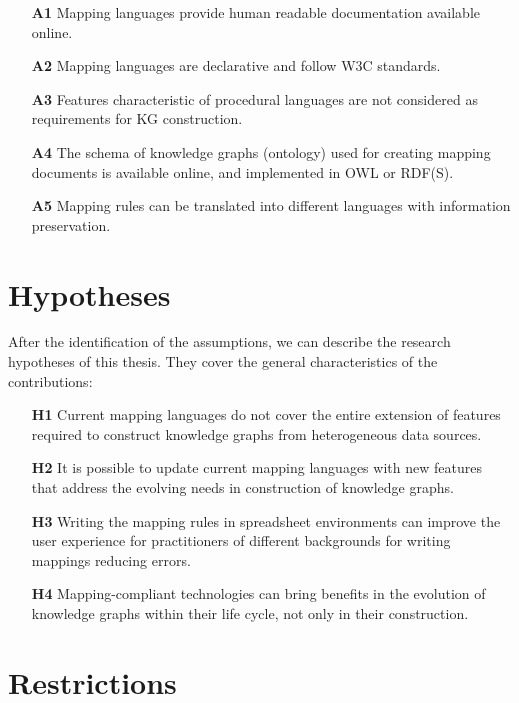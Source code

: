 \begin{enumerate}
    \item[\textbf{A1}] Mapping languages provide human readable documentation available online.
    \item[\textbf{A2}] Mapping languages are declarative and follow W3C standards.
    \item[\textbf{A3}] Features characteristic of procedural languages are not considered as requirements for KG construction. 
    \item[\textbf{A4}] The schema of knowledge graphs (ontology) used for creating mapping documents is available online, and implemented in OWL or RDF(S). 
    \item[\textbf{A5}] Mapping rules can be translated into different languages with information preservation.
\end{enumerate}


\section{Hypotheses}
\label{sec:chp3-hypotheses}

After the identification of the assumptions, we can describe the research hypotheses  of this thesis. They cover the general characteristics of the contributions:

\begin{enumerate}
    \item[\textbf{H1}] Current mapping languages do not cover the entire extension of features required to construct knowledge graphs from heterogeneous data sources.
    \item[\textbf{H2}] It is possible to update  current mapping languages with new features that address the evolving needs in construction of knowledge graphs.
    \item[\textbf{H3}] Writing the mapping rules in spreadsheet environments can improve the user experience for practitioners of different backgrounds for writing mappings reducing errors. 
    \item[\textbf{H4}] Mapping-compliant technologies can bring benefits in the evolution of knowledge graphs within their life cycle, not only in their construction.
\end{enumerate}


\section{Restrictions}
\label{sec:chp3-restrictions}

